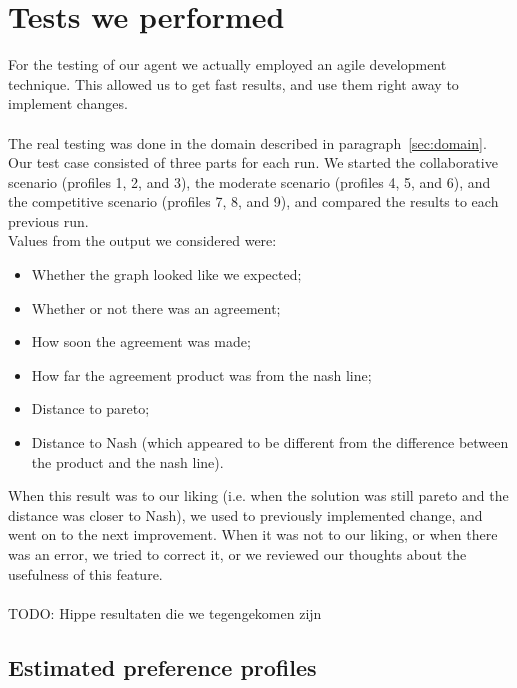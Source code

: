\section{Tests we performed}
For the testing of our agent we actually employed an agile development technique. This allowed us to get fast results, and use them right away to implement changes.
\\\\
The real testing was done in the domain described in paragraph~\ref{sec:domain}. Our test case consisted of three parts for each run. We started the collaborative scenario (profiles 1, 2, and 3), the moderate scenario (profiles 4, 5, and 6), and the competitive scenario (profiles 7, 8, and 9), and compared the results to each previous run.
\\
Values from the output we considered were:
\begin{itemize}
\item Whether the graph looked like we expected;
\item Whether or not there was an agreement;
\item How soon the agreement was made;
\item How far the agreement product was from the nash line;
\item Distance to pareto;
\item Distance to Nash (which appeared to be different from the difference between the product and the nash line).
\end{itemize}

When this result was to our liking (i.e. when the solution was still pareto and the distance was closer to Nash), we used to previously implemented change, and went on to the next improvement. When it was not to our liking, or when there was an error, we tried to correct it, or we reviewed our thoughts about the usefulness of this feature.
\\\\
TODO: Hippe resultaten die we tegengekomen zijn

\subsection{Estimated preference profiles}

